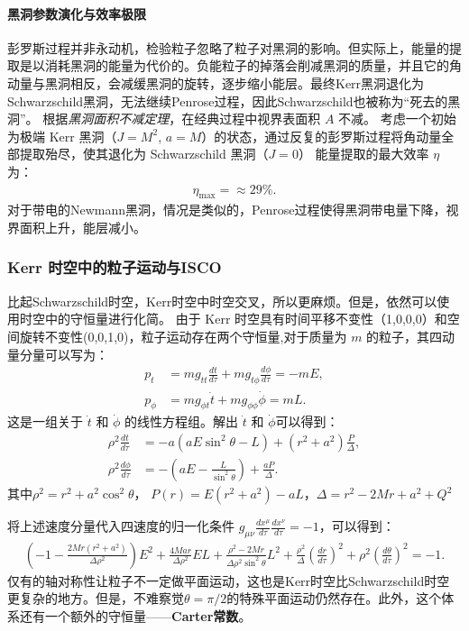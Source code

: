\paragraph{黑洞参数演化与效率极限}
彭罗斯过程并非永动机，检验粒子忽略了粒子对黑洞的影响。但实际上，能量的提取是以消耗黑洞的能量为代价的。负能粒子的掉落会削减黑洞的质量，并且它的角动量与黑洞相反，会减缓黑洞的旋转，逐步缩小能层。最终Kerr黑洞退化为Schwarzschild黑洞，无法继续Penrose过程，因此Schwarzschild也被称为“死去的黑洞”。
根据\textit{黑洞面积不减定理}，在经典过程中视界表面积 $A$ 不减。
考虑一个初始为极端 Kerr 黑洞（$J=M^2$, $a=M$）的状态，通过反复的彭罗斯过程将角动量全部提取殆尽，使其退化为 Schwarzschild 黑洞（$J=0$）
能量提取的最大效率 $\eta$ 为：
\begin{align}
\eta_{\text{max}} = \approx 29\%.
\end{align}
对于带电的Newmann黑洞，情况是类似的，Penrose过程使得黑洞带电量下降，视界面积上升，能层减小。

\subsubsection{Kerr 时空中的粒子运动与ISCO}
比起Schwarzschild时空，Kerr时空中时空交叉，所以更麻烦。但是，依然可以使用时空中的守恒量进行化简。
由于 Kerr 时空具有时间平移不变性（1,0,0,0）和空间旋转不变性(0,0,1,0)，粒子运动存在两个守恒量,对于质量为 $m$ 的粒子，其四动量分量可以写为：
\begin{align}
p_t &= m g_{tt} \frac{d t}{d \tau} + m g_{t\phi} \frac{d\phi}{d\tau} = -mE, \\
p_\phi &= m g_{\phi t} \dot{t} + m g_{\phi\phi} \dot{\phi} = mL.
\end{align}
这是一组关于 $\dot{t}$ 和 $\dot{\phi}$ 的线性方程组。解出 $\dot{t}$ 和 $\dot{\phi}$可以得到：
\begin{align}
\rho^2 \frac{dt}{d\tau} &= -a(aE\sin^2\theta - L) + (r^2+a^2)\frac{P}{\Delta}, \\
\rho^2 \frac{d\phi}{d\tau} &= -\left(aE - \frac{L}{\sin^2\theta}\right) + \frac{aP}{\Delta}.
\end{align}
其中$\rho^2 = r^2 + a^2\cos^2\theta$， $P(r) = E(r^2+a^2) - aL$，$\Delta = r^2 -2Mr +a^2 + Q^2$

将上述速度分量代入四速度的归一化条件 $g_{\mu\nu}\frac{dx^\mu}{d\tau}\frac{dx^\nu}{d\tau} = -1$，可以得到：
\begin{align}
\left( -1 - \frac{2Mr(r^2+a^2)}{\Delta \rho^2} \right) E^2 + \frac{4Mar}{\Delta \rho^2}EL + \frac{\rho^2 - 2Mr}{\Delta \rho^2 \sin^2\theta}L^2 + \frac{\rho^2}{\Delta}\left(\frac{dr}{d\tau}\right)^2 + \rho^2 \left(\frac{d\theta}{d\tau}\right)^2 = -1.
\end{align}
仅有的轴对称性让粒子不一定做平面运动，这也是Kerr时空比Schwarzschild时空更复杂的地方。但是，不难察觉$\theta = \pi/2$的特殊平面运动仍然存在。此外，这个体系还有一个额外的守恒量——\textbf{Carter常数}。
